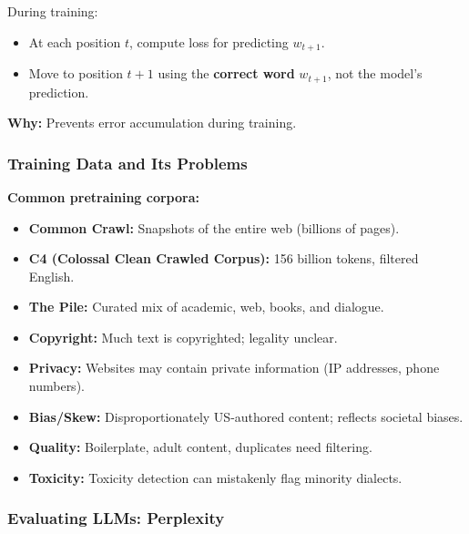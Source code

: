\begin{defbox}
During training:
\begin{itemize}
  \item At each position $t$, compute loss for predicting $w_{t+1}$.
  \item Move to position $t+1$ using the \textbf{correct word} $w_{t+1}$, not the model's prediction.
\end{itemize}

\textbf{Why:} Prevents error accumulation during training.
\end{defbox}

\bigseparator

\subsubsection{Training Data and Its Problems}

\textbf{Common pretraining corpora:}
\begin{itemize}
  \item \textbf{Common Crawl:} Snapshots of the entire web (billions of pages).
  \item \textbf{C4 (Colossal Clean Crawled Corpus):} 156 billion tokens, filtered English.
  \item \textbf{The Pile:} Curated mix of academic, web, books, and dialogue.
\end{itemize}

\begin{tipbox}
\begin{itemize}
  \item \textbf{Copyright:} Much text is copyrighted; legality unclear.
  \item \textbf{Privacy:} Websites may contain private information (IP addresses, phone numbers).
  \item \textbf{Bias/Skew:} Disproportionately US-authored content; reflects societal biases.
  \item \textbf{Quality:} Boilerplate, adult content, duplicates need filtering.
  \item \textbf{Toxicity:} Toxicity detection can mistakenly flag minority dialects.
\end{itemize}
\end{tipbox}

\bigseparator

\subsubsection{Evaluating LLMs: Perplexity}

